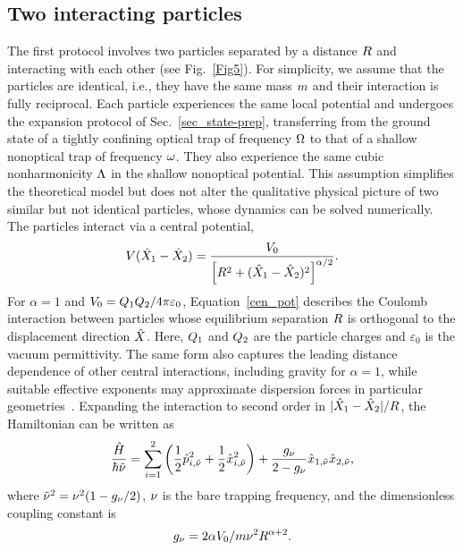 \documentclass[reprint,prx,footinbib,floatfix,twocolumn,longbibliography,superscriptaddress]{revtex4-2}
\begin{document}
\subsection{Two interacting particles}
The first protocol involves two particles separated by a distance $R$ and interacting with each other (see Fig.~\ref{Fig5}).
For simplicity, we assume that the particles are identical, i.e., they have the same mass $m$ and their interaction is fully reciprocal.
Each particle experiences the same local potential and undergoes the expansion protocol of Sec.~\ref{sec_state-prep}, transferring from the ground state of a tightly confining optical trap of frequency $\Omega$ to that of a shallow nonoptical trap of frequency $\omega$.
They also experience the same cubic nonharmonicity $\Lambda$ in the shallow nonoptical potential.
This assumption simplifies the theoretical model but does not alter the qualitative physical picture of two similar but not identical particles, whose dynamics can be solved numerically.
The particles interact via a central potential,
\begin{align}
    V(\hat{X}_1 - \hat{X}_2) = \frac{V_0}{\left[R^2 + (\hat{X}_1 - \hat{X}_2)^2 \right]^{\alpha/2}}.
    \label{cen_pot}
\end{align}
For $\alpha = 1$ and $V_0 = Q_1 Q_2 / 4 \pi \varepsilon_0$, Equation~\eqref{cen_pot} describes the Coulomb interaction between particles whose equilibrium separation $R$ is orthogonal to the displacement direction $\hat{X}$.
Here, $Q_1$ and $Q_2$ are the particle charges and $\varepsilon_0$ is the vacuum permittivity.
The same form also captures the leading distance dependence of other central interactions, including gravity for $\alpha = 1$, while suitable effective exponents may approximate dispersion forces in particular geometries~\cite{Weiss2021}.
Expanding the interaction to second order in $|\hat{X}_1 - \hat{X}_2|/R$, the Hamiltonian can be written as 
\begin{align}
    \frac{\hat{H}}{\hbar \tilde{\nu}} = \sum_{i=1}^2 \left( \frac{1}{2} \hat{p}_{i,\tilde{\nu}}^2 + \frac{1}{2} \hat{x}_{i,\tilde{\nu}}^2 \right) + \frac{g_\nu} {2-g_\nu} \hat{x}_{1,\tilde{\nu}}\hat{x}_{2,\tilde{\nu}},
    \label{linearized}
\end{align}
where $\tilde{\nu}^2 = \nu^2(1-g_\nu/2)$, $\nu$ is the bare trapping frequency, and the dimensionless coupling constant is
\begin{align}
g_\nu = 2\alpha V_0 / m \nu^2 R^{\alpha+2}.
\end{align}
\end{document}
